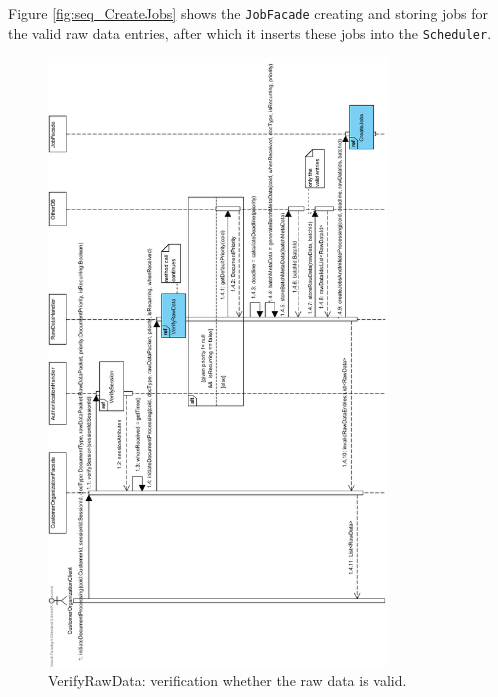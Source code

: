\documentclass[a4paper,10pt]{article}
\begin{document}
Figure \ref{fig:seq_CreateJobs} shows the \texttt{JobFacade} creating and storing jobs for the valid raw data entries, after which it inserts these jobs into the \texttt{Scheduler}.\\


\begin{figure}[!htp]
    \centering
    \includegraphics[width=0.8\textwidth]{Seq_UC3InitiateDocumentProcessing.png}
    \caption{VerifyRawData: verification whether the raw data is valid.
        }\label{fig:seq_UC3InitiateDocumentProcessing}
\end{figure}
\end{document}
